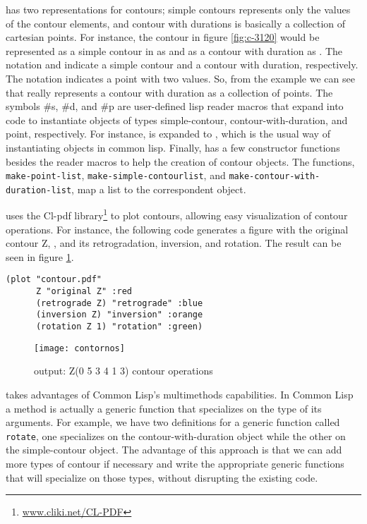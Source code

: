 \goiaba{} has two representations for contours; simple contours
represents only the values of the contour elements, and contour with
durations is basically a collection of cartesian points.  For instance, the contour in
figure \ref{fig:c-3120} would be represented as a simple contour in
\goiaba{} as  and as a contour with duration as
. The notation
 and  indicate a simple contour
and a contour with duration, respectively. The notation  indicates a point with two values. So, from the example we can
see that \goiaba{} really represents a contour with duration as a
collection of points. The symbols \#s, \#d, and \#p are user-defined
lisp reader macros that expand into code to instantiate objects of
types simple-contour, contour-with-duration, and point, respectively.
For instance,  is expanded to , which is the usual way of instantiating objects
in common lisp. Finally, \goiaba{} has a few constructor functions
besides the reader macros to help the creation of contour objects. The
functions, \texttt{make-point-list},
\texttt{make-sim\-ple-contour\-list}, and
\texttt{make-contour-with-dura\-tion-list}, map a list to the
correspondent object.

\goiaba{} uses the Cl-pdf library\footnote{\url{www.cliki.net/CL-PDF}}
to plot contours, allowing easy visualization of contour operations.
For instance, the following code generates a figure with the original
contour Z, , and its retrogradation, inversion,
and rotation. The result can be seen in figure \ref{fig:operacoes}.

\begin{verbatim}
(plot "contour.pdf"
      Z "original Z" :red
      (retrograde Z) "retrograde" :blue
      (inversion Z) "inversion" :orange
      (rotation Z 1) "rotation" :green)
\end{verbatim}

\begin{figure}
  \centering
  \texttt{[image: contornos]}
  \caption{\goiaba{} output: Z(0 5 3 4 1 3) contour operations}
  \label{fig:operacoes}
\end{figure}

\goiaba{} takes advantages of Common Lisp's multimethods capabilities.
In Common Lisp a method is actually a generic function that
specializes on the type of its arguments. For example, we have two
definitions for a generic function called \texttt{rotate}, one
specializes on the contour-with-duration object while the other on the
simple-contour object. The advantage of this approach is that we can
add more types of contour if necessary and write the appropriate
generic functions that will specialize on those types, without
disrupting the existing code.

